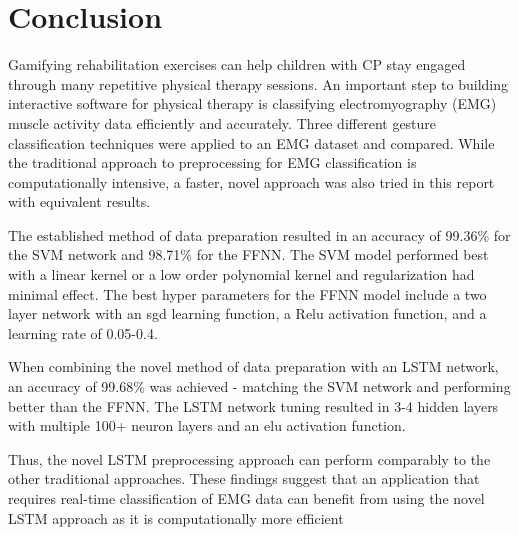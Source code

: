 \documentclass[journal]{IEEEtran}
\begin{document}
\section{Conclusion}
\label{sec:conclusion}
Gamifying rehabilitation exercises can help children with CP stay engaged through many repetitive physical therapy sessions. An important step to building interactive software for physical therapy is classifying electromyography (EMG) muscle activity data efficiently and accurately. Three different gesture classification techniques were applied to an EMG dataset and compared. While the traditional approach to preprocessing for EMG classification is computationally intensive, a faster, novel approach was also tried in this report with equivalent results. 

The established method of data preparation resulted in an accuracy of 99.36\% for the SVM network and 98.71\% for the FFNN. The SVM model performed best with a linear kernel or a low order polynomial kernel and regularization had minimal effect. The best hyper parameters for the FFNN model include a two layer network with an sgd learning function, a Relu activation function, and a learning rate of 0.05-0.4. 

When combining the novel method of data preparation with an LSTM network, an accuracy of 99.68\% was achieved - matching the SVM network and performing better  than the FFNN. The LSTM network tuning resulted in 3-4 hidden layers with multiple 100+ neuron layers and an elu activation function. 

Thus, the novel LSTM preprocessing approach can perform comparably to the other traditional approaches. These findings suggest that an application that requires real-time classification of EMG data can benefit from using the novel LSTM approach as it is computationally more efficient













\end{document}
